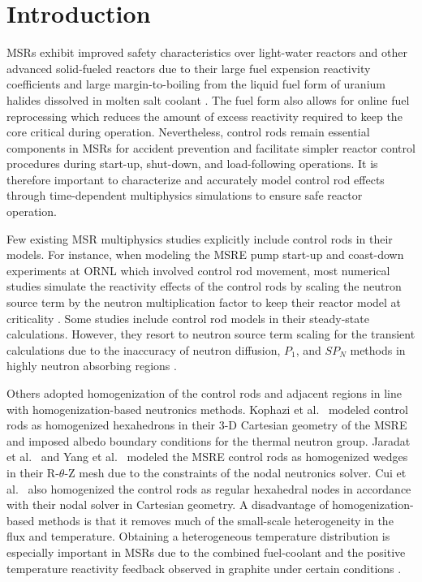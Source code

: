 \section{Introduction}

\glspl{MSR} exhibit improved safety characteristics over light-water reactors and other advanced
solid-fueled reactors due to their large fuel expension reactivity coefficients and large
margin-to-boiling from the liquid fuel form of uranium halides dissolved in molten salt coolant
\cite{dolan_1_2017}.
The fuel form also allows for online fuel reprocessing which reduces the amount of excess
reactivity required to keep the core critical during operation. Nevertheless, control rods remain
essential components in \glspl{MSR} for accident prevention and facilitate simpler reactor control
procedures during start-up, shut-down, and load-following operations. It is therefore important to
characterize and accurately model control rod effects through time-dependent multiphysics
simulations to ensure safe reactor operation.

Few existing \gls{MSR} multiphysics studies explicitly include control rods in their models. For
instance, when modeling the \gls{MSRE} pump start-up and coast-down experiments at \gls{ORNL} which
involved control rod movement, most numerical studies simulate the reactivity effects of the
control rods by scaling the neutron source term by the neutron multiplication factor to keep their
reactor model at
criticality \cite{delpech_benchmark_2003, krepel_dyn3d-msr_2007}. Some studies include control rod
models in their steady-state calculations. However, they resort to neutron source term scaling for
the transient calculations due to the inaccuracy of neutron diffusion, $P_1$, and $SP_N$ methods in
highly neutron absorbing regions \cite{kophazi_development_2009, jaradat_development_2021,
yang_development_2022}.

Others adopted homogenization of the control rods and adjacent regions in line with
homogenization-based neutronics methods. Kophazi et al.\ \cite{kophazi_development_2009} modeled
control rods as homogenized hexahedrons in their 3-D Cartesian geometry of the \gls{MSRE}
and imposed albedo boundary conditions for the thermal neutron group. Jaradat et al.\
\cite{jaradat_development_2021} and Yang et al.\ \cite{yang_development_2022} modeled the
\gls{MSRE} control rods as homogenized wedges in their R-$\theta$-Z mesh due to the constraints of
the nodal neutronics solver. Cui et al.\ \cite{cui_development_2021} also homogenized the control
rods as regular hexahedral nodes in accordance with their nodal solver in Cartesian geometry. A
disadvantage of homogenization-based methods is that it removes much of the small-scale
heterogeneity in the flux and temperature. Obtaining a heterogeneous temperature distribution is
especially important in \glspl{MSR} due to the combined fuel-coolant and the positive temperature
reactivity feedback observed in graphite under certain conditions \cite{mathieu_thorium_2006}.

